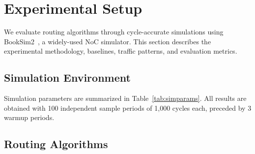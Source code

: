 \section{Experimental Setup}
\label{sec:experiments}

We evaluate routing algorithms through cycle-accurate simulations using BookSim2~\cite{booksim}, a widely-used NoC simulator. This section describes the experimental methodology, baselines, traffic patterns, and evaluation metrics.

\subsection{Simulation Environment}

Simulation parameters are summarized in Table~\ref{tab:simparams}. All results are obtained with 100 independent sample periods of 1,000 cycles each, preceded by 3 warmup periods.

\begin{table}[h]
\centering
\caption{BookSim2 simulation parameters}
\label{tab:simparams}
\end{table}

\subsection{Routing Algorithms}


